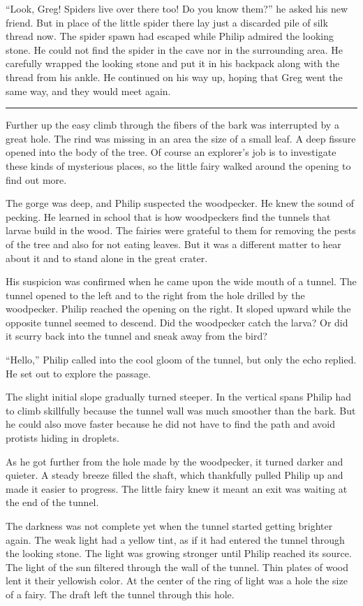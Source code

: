 \documentclass[10pt, draft]{memoir}
\renewcommand{\pfbreakdisplay}{\bigskip \ding{166} \bigskip}
\newcommand{\secbreak}{\fancybreak{\pfbreakdisplay}}
\begin{document}
``Look, Greg! Spiders live over there too! Do you know them?'' he asked his new friend. But in place of the little spider there lay just a discarded pile of silk thread now. The spider spawn had escaped while Philip admired the looking stone. He could not find the spider in the cave nor in the surrounding area. He carefully wrapped the looking stone and put it in his backpack along with the thread from his ankle. He continued on his way up, hoping that Greg went the same way, and they would meet again.

\secbreak

Further up the easy climb through the fibers of the bark was interrupted by a great hole. The rind was missing in an area the size of a small leaf. A deep fissure opened into the body of the tree. Of course an explorer's job is to investigate these kinds of mysterious places, so the little fairy walked around the opening to find out more.

The gorge was deep, and Philip suspected the woodpecker. He knew the sound of pecking. He learned in school that is how woodpeckers find the tunnels that larvae build in the wood. The fairies were grateful to them for removing the pests of the tree and also for not eating leaves. But it was a different matter to hear about it and to stand alone in the great crater.

His suspicion was confirmed when he came upon the wide mouth of a tunnel. The tunnel opened to the left and to the right from the hole drilled by the woodpecker. Philip reached the opening on the right. It sloped upward while the opposite tunnel seemed to descend. Did the woodpecker catch the larva? Or did it scurry back into the tunnel and sneak away from the bird?

``Hello,'' Philip called into the cool gloom of the tunnel, but only the echo replied. He set out to explore the passage.

The slight initial slope gradually turned steeper. In the vertical spans Philip had to climb skillfully because the tunnel wall was much smoother than the bark. But he could also move faster because he did not have to find the path and avoid protists hiding in droplets.

As he got further from the hole made by the woodpecker, it turned darker and quieter. A steady breeze filled the shaft, which thankfully pulled Philip up and made it easier to progress. The little fairy knew it meant an exit was waiting at the end of the tunnel.

The darkness was not complete yet when the tunnel started getting brighter again. The weak light had a yellow tint, as if it had entered the tunnel through the looking stone. The light was growing stronger until Philip reached its source. The light of the sun filtered through the wall of the tunnel. Thin plates of wood lent it their yellowish color. At the center of the ring of light was a hole the size of a fairy. The draft left the tunnel through this hole.
\end{document}

